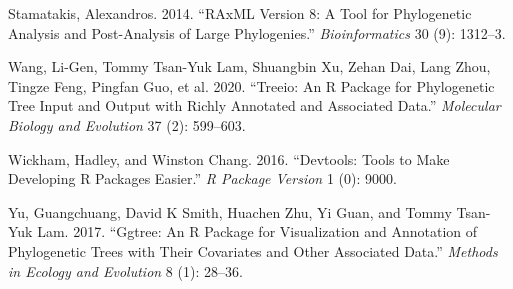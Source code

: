 \documentclass[
]{article}
\begin{document}
\leavevmode\hypertarget{ref-stamatakis2014raxml}{}%
Stamatakis, Alexandros. 2014. ``RAxML Version 8: A Tool for Phylogenetic
Analysis and Post-Analysis of Large Phylogenies.'' \emph{Bioinformatics}
30 (9): 1312--3.

\leavevmode\hypertarget{ref-wang2020treeio}{}%
Wang, Li-Gen, Tommy Tsan-Yuk Lam, Shuangbin Xu, Zehan Dai, Lang Zhou,
Tingze Feng, Pingfan Guo, et al. 2020. ``Treeio: An R Package for
Phylogenetic Tree Input and Output with Richly Annotated and Associated
Data.'' \emph{Molecular Biology and Evolution} 37 (2): 599--603.

\leavevmode\hypertarget{ref-wickham2016devtools}{}%
Wickham, Hadley, and Winston Chang. 2016. ``Devtools: Tools to Make
Developing R Packages Easier.'' \emph{R Package Version} 1 (0): 9000.

\leavevmode\hypertarget{ref-yu2017ggtree}{}%
Yu, Guangchuang, David K Smith, Huachen Zhu, Yi Guan, and Tommy Tsan-Yuk
Lam. 2017. ``Ggtree: An R Package for Visualization and Annotation of
Phylogenetic Trees with Their Covariates and Other Associated Data.''
\emph{Methods in Ecology and Evolution} 8 (1): 28--36.
\end{document}
